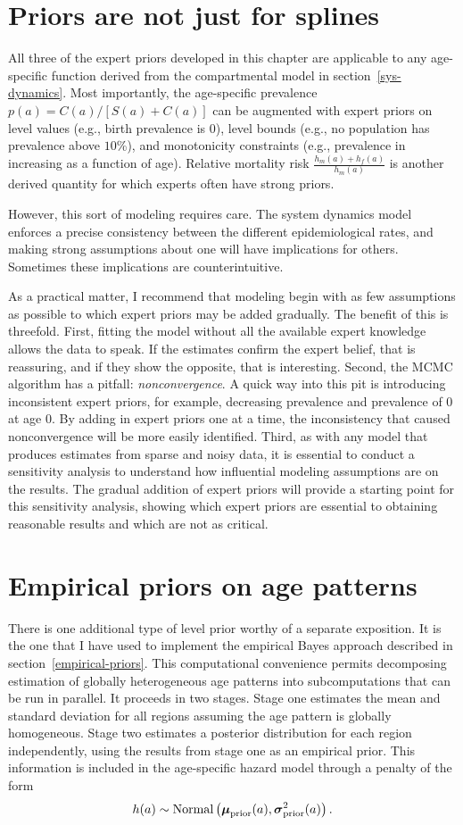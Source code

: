 \section{Priors are not just for splines}
All three of the expert priors developed in this chapter are
applicable to any age-specific function derived from the compartmental
model in section~\ref{sys-dynamics}. Most importantly, the
age-specific prevalence $p(a) = C(a)/\left[S(a)+C(a)\right]$ can be augmented with expert
priors on level values (e.g., birth prevalence is $0$), level bounds
(e.g., no population has prevalence above $10$\%), and monotonicity
constraints (e.g., prevalence in increasing as a function of
age). Relative mortality risk $\frac{h_m(a)+h_f(a)}{h_m(a)}$ is another derived quantity
for which experts often have strong priors.

However, this sort of modeling requires care. The system dynamics
model enforces a precise consistency between the different
epidemiological rates, and making strong assumptions about one will
have implications for others.  Sometimes these implications are
counterintuitive.

As a practical matter, I recommend that modeling begin with as few
assumptions as possible to which expert priors may be added gradually. The
benefit of this is threefold.  First, fitting the model without all
the available expert knowledge allows the data to speak.  If the estimates
confirm the expert belief, that is reassuring, and if they show the
opposite, that is interesting. Second, the MCMC algorithm has a
pitfall: \emph{nonconvergence}. A quick way into this pit is
introducing inconsistent expert priors, for example, decreasing
prevalence and prevalence of $0$ at age $0$. By adding in expert
priors one at a time, the inconsistency that caused nonconvergence
will be more easily identified. Third, as with any model that produces
estimates from sparse and noisy data, it is essential to conduct a
sensitivity analysis to understand how influential modeling
assumptions are on the results.  The gradual addition of expert priors
will provide a starting point for this sensitivity analysis, showing
which expert priors are essential to obtaining reasonable results and
which are not as critical.

\section{Empirical priors on age patterns}
There is one additional type of level prior worthy of a separate
exposition. It is the one that I have used to implement the empirical
Bayes approach described in section~\ref{empirical-priors}.  This
computational convenience permits decomposing estimation of globally
heterogeneous age patterns into subcomputations that can be run in
parallel.  It proceeds in two stages.  Stage one estimates the mean
and standard deviation for all regions assuming the age pattern is
globally homogeneous.  Stage two estimates a posterior distribution
for each region independently, using the results from stage one as an
empirical prior.  This information is included in the age-specific
hazard model through a penalty of the form
\[
h(a) \sim \operatorname{Normal}\left(\boldsymbol{\mu}_{\text{prior}}(a),
\boldsymbol{\sigma}_{\text{prior}}^2(a)\right).
\]

